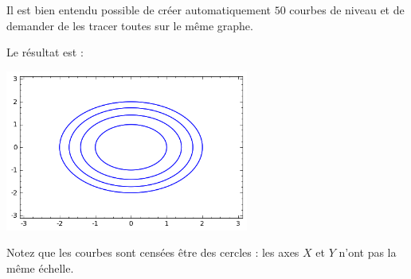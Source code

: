 Il est bien entendu possible de créer automatiquement $50$ courbes de niveau et de demander de les tracer toutes sur le même graphe.


Le résultat est :

\begin{center}
        \includegraphics[width=8cm]{pictures_bitmap/niveauCercles.png}
\end{center}
Notez que les courbes sont censées être des cercles : les axes $X$ et $Y$ n'ont pas la même échelle. 


